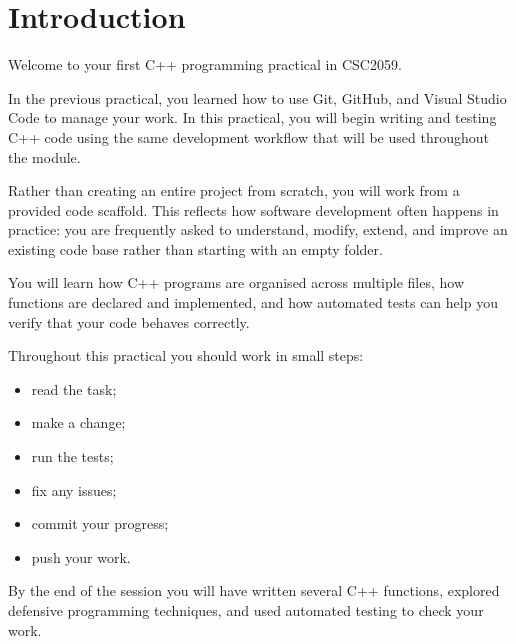 \documentclass{csc2059practical}
\begin{document}
\maketitle
\tableofcontents
\clearpage

\section{Introduction}

Welcome to your first C++ programming practical in CSC2059.

In the previous practical, you learned how to use Git, GitHub, and Visual Studio Code to manage your work. In this practical, you will begin writing and testing C++ code using the same development workflow that will be used throughout the module.

Rather than creating an entire project from scratch, you will work from a provided code scaffold. This reflects how software development often happens in practice: you are frequently asked to understand, modify, extend, and improve an existing code base rather than starting with an empty folder.

You will learn how C++ programs are organised across multiple files, how functions are declared and implemented, and how automated tests can help you verify that your code behaves correctly.

Throughout this practical you should work in small steps:

\begin{itemize}
  \item read the task;
  \item make a change;
  \item run the tests;
  \item fix any issues;
  \item commit your progress;
  \item push your work.
\end{itemize}

By the end of the session you will have written several C++ functions, explored defensive programming techniques, and used automated testing to check your work.
\end{document}
